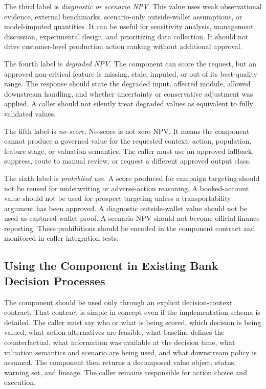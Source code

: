 \documentclass[11pt]{article}
\newcommand{\1}{\mathbf{1}}
\begin{document}
The third label is \emph{diagnostic or scenario NPV}. This value uses weak
observational evidence, external benchmarks, scenario-only outside-wallet
assumptions, or model-imputed quantities. It can be useful for sensitivity
analysis, management discussion, experimental design, and prioritizing data
collection. It should not drive customer-level production action ranking
without additional approval.

The fourth label is \emph{degraded NPV}. The component can score the request,
but an approved non-critical feature is missing, stale, imputed, or out of its
best-quality range. The response should state the degraded input, affected
module, allowed downstream handling, and whether uncertainty or conservative
adjustment was applied. A caller should not silently treat degraded values as
equivalent to fully validated values.

The fifth label is \emph{no-score}. No-score is not zero NPV. It means the
component cannot produce a governed value for the requested context, action,
population, feature stage, or valuation semantics. The caller must use an
approved fallback, suppress, route to manual review, or request a different
approved output class.

The sixth label is \emph{prohibited use}. A score produced for campaign
targeting should not be reused for underwriting or adverse-action reasoning. A
booked-account value should not be used for prospect targeting unless a
transportability argument has been approved. A diagnostic outside-wallet value
should not be used as captured-wallet proof. A scenario NPV should not become
official finance reporting. These prohibitions should be encoded in the
component contract and monitored in caller integration tests.

\subsection{Using the Component in Existing Bank Decision Processes}
\label{sec:decision-use}

The component should be used only through an explicit decision-context
contract. That contract is simple in concept even if the implementation schema
is detailed. The caller must say who or what is being scored, which decision is
being valued, what action alternatives are feasible, what baseline defines the
counterfactual, what information was available at the decision time, what
valuation semantics and scenario are being used, and what downstream policy is
assumed. The component then returns a decomposed value object, status, warning
set, and lineage. The caller remains responsible for action choice and
execution.
\end{document}
